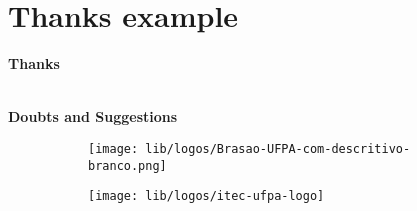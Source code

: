\documentclass[aspectratio=169,t,xcolor=table]{beamer}
\begin{document}
    \section{Thanks example}
    \begin{frame}

        \centering
        \vspace{2cm}

        \textbf{\Huge Thanks}

        \ \\

        \textbf{Doubts and Suggestions}
        \ \\


        \vspace{.5cm}
        \begin{figure}
            \centering
            \begin{subfigure}{0.2\textwidth}
                \centering
                \texttt{[image: lib/logos/Brasao-UFPA-com-descritivo-branco.png]}
            \end{subfigure}%
            \qquad
            \begin{subfigure}{0.2\textwidth}
                \centering
                \texttt{[image: lib/logos/itec-ufpa-logo]}
            \end{subfigure}

        \end{figure}

    \end{frame}

    \titlepage
\end{document}
